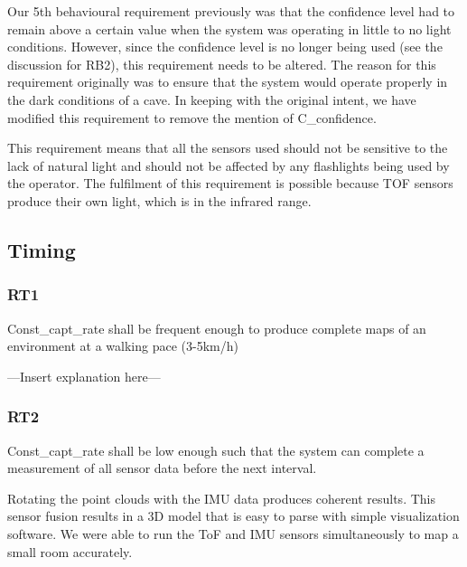 \documentclass[11pt]{article}
\begin{document}
	Our 5th behavioural requirement previously was that the confidence level had to remain above a certain value when the system was operating in little to no light conditions. However, since the confidence level is no longer being used (see the discussion for RB2), this requirement needs to be altered. The reason for this requirement originally was to ensure that the system would operate properly in the dark conditions of a cave. In keeping with the original intent, we have modified this requirement to remove the mention of C\_confidence. 
	
	This requirement means that all the sensors used should not be sensitive to the lack of natural light and should not be affected by any flashlights being used by the operator. The fulfilment of this requirement is possible because TOF sensors produce their own light, which is in the infrared range. 
	
	
	\subsection{Timing}
	
	\subsubsection{RT1}
	
	\begin{exampleblock}
		Const\_capt\_rate shall be frequent enough to produce complete maps of an environment at a walking pace (3-5km/h)
	\end{exampleblock}
	
	---Insert explanation here---
	
	\subsubsection{RT2}
	
	\begin{exampleblock}
		Const\_capt\_rate shall be low enough such that the system can complete a measurement of all sensor data before the next interval.
	\end{exampleblock}
	
	Rotating the point clouds with the IMU data produces coherent results. This sensor fusion results in a 3D model that is easy to parse with simple visualization software. We were able to run the ToF and IMU sensors simultaneously to map a small room accurately. 
	
\end{document}
